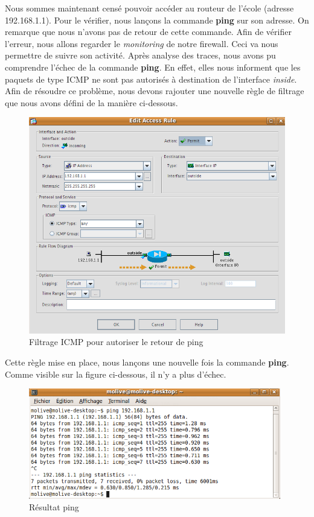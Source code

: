 \documentclass[a4paper,12pt]{article}
\begin{document}
Nous sommes maintenant censé pouvoir accéder au routeur de l'école (adresse 192.168.1.1). Pour le vérifier, nous lançons la commande \textbf{ping} sur son adresse. On remarque que nous n'avons pas de retour de cette commande. Afin de vérifier l'erreur, nous allons regarder le \textit{monitoring} de notre firewall. Ceci va nous permettre de suivre son activité. Après analyse des traces, nous avons pu comprendre l'échec de la commande \textbf{ping}. En effet, elles nous informent que les paquets de type ICMP ne sont pas autorisés à destination de l'interface \textit{inside}. Afin de résoudre ce problème, nous devons rajouter une nouvelle règle de filtrage que nous avons défini de la manière ci-dessous.
\begin{figure}[H]
	\center
	\includegraphics[width=12cm]{img/9-Pingrevientpasflitrageicmp.png}
	\caption{Filtrage ICMP pour autoriser le retour de ping}
\end{figure}

Cette règle mise en place, nous lançons une nouvelle fois la commande \textbf{ping}. Comme visible sur la figure ci-dessous, il n'y a plus d'échec.
\begin{figure}[H]
	\center
	\includegraphics[width=11cm]{img/10-pingok.png}
	\caption{Résultat ping}
\end{figure}
\end{document}

